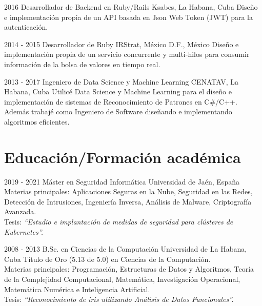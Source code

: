\documentclass[]{friggeri-cv}
\begin{document}
\begin{entrylist}
  \entry
    {2016}
    {Desarrollador de Backend en Ruby/Rails}
    {Ksabes, La Habana, Cuba}
    {Diseño e implementación propia de un API basada en Json Web Token (JWT) para la autenticación.\\}

  \entry
    {2014 - 2015}
    {Desarrollador de Ruby}
    {IRStrat, México D.F., México}
    {Diseño e implementación propia de un servicio concurrente y multi-hilos para consumir información de la bolsa de valores en tiempo real.\\}

  \entry
    {2013 - 2017}
    {Ingeniero de Data Science y Machine Learning}
    {CENATAV, La Habana, Cuba}
    {Utilicé Data Science y Machine Learning para el diseño e implementación de sistemas de Reconocimiento de Patrones en C\#/C++. Además trabajé como Ingeniero de Software diseñando e implementando algoritmos eficientes.\\}
\end{entrylist}

\section{Educación/Formación académica}
\begin{entrylist}
  \entry
    {2019 - 2021}
    {Máster en Seguridad Informática}
    {Universidad de Jaén, España}
    {
      Materias principales: Aplicaciones Seguras en la Nube, Seguridad en las Redes, Detección de Intrusiones, Ingeniería Inversa, Análisis de Malware, Criptografía Avanzada.\\
      Tesis: \emph{``Estudio e implantación de medidas de seguridad para clústeres de Kubernetes''.}\\
    }

  \entry
    {2008 - 2013}
    {B.Sc. en Ciencias de la Computación}
    {Universidad de La Habana, Cuba}
    {Título de Oro (5.13 de 5.0) en Ciencias de la Computación.\\ Materias principales: Programación, Estructuras de Datos y Algoritmos, Teoría de la Complejidad Computacional, Matemática, Investigación Operacional, Matemática Numérica e Inteligencia Artificial.\\
    Tesis: \emph{``Reconocimiento de iris utilizando Análisis de Datos Funcionales''.}}

\end{entrylist}
\end{document}
